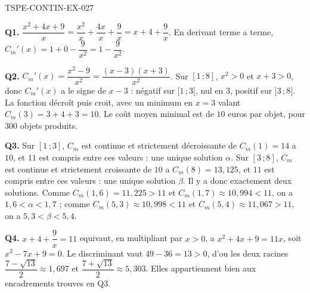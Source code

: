 \begin{corrige}{TSPE-CONTIN-EX-027}

\textbf{Q1.} $\dfrac{x^2+4x+9}{x} = \dfrac{x^2}{x} + \dfrac{4x}{x} + \dfrac{9}{x} = x + 4 + \dfrac{9}{x}$. En derivant terme a terme, $C_m'(x) = 1 + 0 - \dfrac{9}{x^2} = 1 - \dfrac{9}{x^2}$.

\textbf{Q2.} $C_m'(x) = \dfrac{x^2 - 9}{x^2} = \dfrac{(x-3)(x+3)}{x^2}$. Sur $[1\,;8]$, $x^2 > 0$ et $x + 3 > 0$, donc $C_m'(x)$ a le signe de $x - 3$ : négatif sur $[1\,;3[$, nul en $3$, positif sur $]3\,;8]$. La fonction décroît puis croit, avec un minimum en $x = 3$ valant $C_m(3) = 3 + 4 + 3 = 10$. Le coût moyen minimal est de $10$ euros par objet, pour $300$ objets produits.

\textbf{Q3.} Sur $[1\,;3]$, $C_m$ est continue et strictement décroissante de $C_m(1) = 14$ a $10$, et $11$ est compris entre ces valeurs : une unique solution $\alpha$. Sur $[3\,;8]$, $C_m$ est continue et strictement croissante de $10$ a $C_m(8) = 13{,}125$, et $11$ est compris entre ces valeurs : une unique solution $\beta$. Il y a donc exactement deux solutions. Comme $C_m(1{,}6) = 11{,}225 > 11$ et $C_m(1{,}7) \approx 10{,}994 < 11$, on a $1{,}6 < \alpha < 1{,}7$ ; comme $C_m(5{,}3) \approx 10{,}998 < 11$ et $C_m(5{,}4) \approx 11{,}067 > 11$, on a $5{,}3 < \beta < 5{,}4$.

\textbf{Q4.} $x + 4 + \dfrac{9}{x} = 11$ equivaut, en multipliant par $x > 0$, a $x^2 + 4x + 9 = 11x$, soit $x^2 - 7x + 9 = 0$. Le discriminant vaut $49 - 36 = 13 > 0$, d'ou les deux racines $\dfrac{7 - \sqrt{13}}{2} \approx 1{,}697$ et $\dfrac{7 + \sqrt{13}}{2} \approx 5{,}303$. Elles appartiennent bien aux encadrements trouves en Q3.
\end{corrige}
